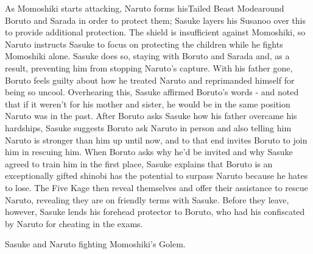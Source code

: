 \documentclass[a4paper,12pt]{article}
\begin{document}
As Momoshiki starts attacking, Naruto forms hisTailed Beast Modearound Boruto and Sarada in order to protect them; Sasuke layers his Susanoo over this to provide additional protection. The shield is insufficient against Momoshiki, so Naruto instructs Sasuke to focus on protecting the children while he fights Momoshiki alone. Sasuke does so, staying with Boruto and Sarada and, as a result, preventing him from stopping Naruto's capture. With his father gone, Boruto feels guilty about how he treated Naruto and reprimanded himself for being so uncool. Overhearing this, Sasuke affirmed Boruto's words - and noted that if it weren't for his mother and sister, he would be in the same position Naruto was in the past. After Boruto asks Sasuke how his father overcame his hardships, Sasuke suggests Boruto ask Naruto in person and also telling him Naruto is stronger than him up until now, and to that end invites Boruto to join him in rescuing him. When Boruto asks why he'd be invited and why Sasuke agreed to train him in the first place, Sasuke explains that Boruto is an exceptionally gifted shinobi has the potential to surpass Naruto because he hates to lose. The Five Kage then reveal themselves and offer their assistance to rescue Naruto, revealing they are on friendly terms with Sasuke. Before they leave, however, Sasuke lends his forehead protector to Boruto, who had his confiscated by Naruto for cheating in the exams.\\ \par \vspace{0.5cm}

Sasuke and Naruto fighting Momoshiki's Golem.\\ \par \vspace{0.5cm}
\end{document}
